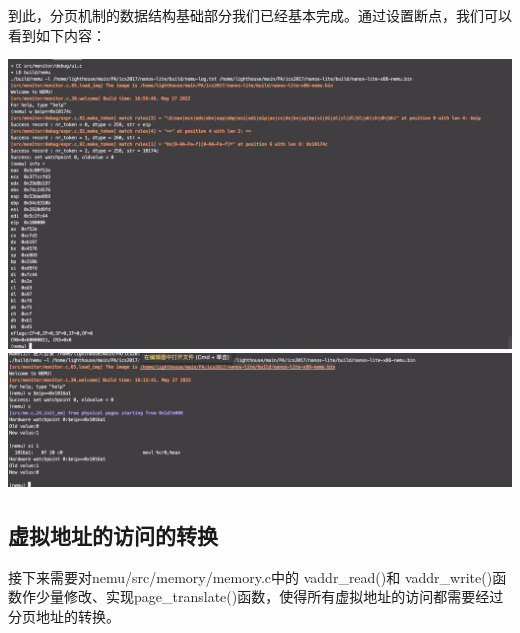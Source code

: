 \documentclass[UTF8,a4paper,10pt]{ctexart}
\begin{document}
到此，分页机制的数据结构基础部分我们已经基本完成。通过设置断点，我们可以看到如下内容：
\begin{center}
  \includegraphics*[scale = 0.25]{img/2}
  \includegraphics*[scale = 0.25]{img/3}
\end{center}

\subsection{虚拟地址的访问的转换}
接下来需要对nemu/src/memory/memory.c中的 vaddr\_read()和 vaddr\_write()函数作少量修改、实现page\_translate()函数，使得所有虚拟地址的访问都需要经过分页地址的转换。
\end{document}
